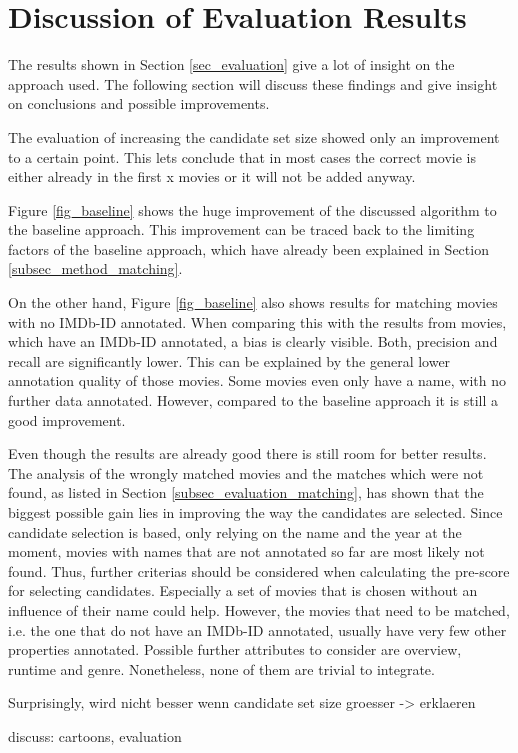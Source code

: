 \section{Discussion of Evaluation Results}
\label{sec_discussion}

The results shown in Section \ref{sec_evaluation} give a lot of insight on the approach used.
The following section will discuss these findings and give insight on conclusions and possible improvements.

The evaluation of increasing the candidate set size showed only an improvement to a certain point.
This lets conclude that in most cases the correct movie is either already in the first x movies or it will not be added anyway.

Figure \ref{fig_baseline} shows the huge improvement of the discussed algorithm to the baseline approach.
This improvement can be traced back to the limiting factors of the baseline approach, which have already been explained in Section \ref{subsec_method_matching}.

On the other hand, Figure \ref{fig_baseline} also shows results for matching movies with no IMDb-ID annotated.
When comparing this with the results from movies, which have an IMDb-ID annotated, a bias is clearly visible.
Both, precision and recall are significantly lower.
This can be explained by the general lower annotation quality of those movies.
Some movies even only have a name, with no further data annotated.
However, compared to the baseline approach it is still a good improvement.

Even though the results are already good there is still room for better results.
The analysis of the wrongly matched movies and the matches which were not found, as listed in Section \ref{subsec_evaluation_matching}, has shown that the biggest possible gain lies in improving the way the candidates are selected.
Since candidate selection is based, only relying on the name and the year at the moment, movies with names that are not annotated so far are most likely not found.
Thus, further criterias should be considered when calculating the pre-score for selecting candidates.
Especially a set of movies that is chosen without an influence of their name could help.
However, the movies that need to be matched, i.e. the one that do not have an IMDb-ID annotated, usually have very few other properties annotated.
Possible further attributes to consider are overview, runtime and genre.
Nonetheless, none of them are trivial to integrate.

Surprisingly, wird nicht besser wenn candidate set size groesser -> erklaeren

discuss: cartoons, evaluation


